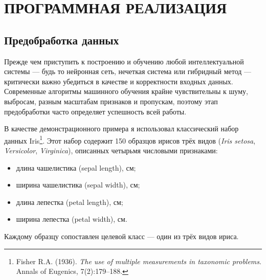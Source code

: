 \section{ПРОГРАММНАЯ РЕАЛИЗАЦИЯ}
\eskdrerun{}

\subsection{Предобработка данных}

Прежде чем приступить к построению и обучению любой интеллектуальной системы — будь то нейронная сеть, нечеткая система или гибридный метод — критически важно убедиться в качестве и корректности входных данных. Современные алгоритмы машинного обучения крайне чувствительны к шуму, выбросам, разным масштабам признаков и пропускам, поэтому этап предобработки часто определяет успешность всей работы.

В качестве демонстрационного примера я использовал классический набор данных Iris\footnote{Fisher R.A. (1936). \emph{The use of multiple measurements in taxonomic problems}. Annals of Eugenics, 7(2):179–188.}. Этот набор содержит 150 образцов ирисов трёх видов (\emph{Iris setosa}, \emph{Versicolor}, \emph{Virginica}), описанных четырьмя числовыми признаками:
\begin{itemize}
  \item длина чашелистика (sepal length), см;
  \item ширина чашелистика (sepal width), см;
  \item длина лепестка (petal length), см;
  \item ширина лепестка (petal width), см.
\end{itemize}
Каждому образцу сопоставлен целевой класс — один из трёх видов ириса.

